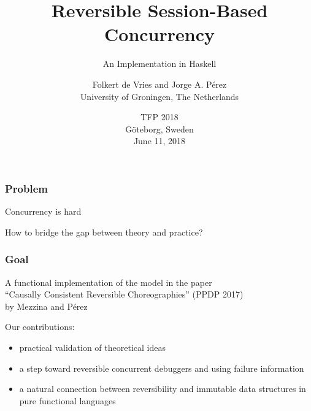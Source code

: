 \documentclass[12pt]{beamer}
\institute{}
\title[\textcolor{white}{Reversible Session-Based Concurrency}]{Reversible Session-Based Concurrency}
\subtitle{An Implementation in Haskell}
\author[de Vries \& P\'{e}rez]{{\large Folkert de Vries and  	
Jorge A. P\'{e}rez} \\ [2mm]
University of Groningen, The Netherlands
}
\date[June 11, 2018]
{
TFP 2018\\ G\"{o}teborg, Sweden
\\
June 11, 2018
}
\begin{document}
%
%
%


\begin{frame}

\begin{center}
\maketitle
\end{center}

\end{frame}


\begin{frame}
\frametitle{Problem}
\begin{center}

    \LARGE{Concurrency is hard}

    \Large{How to bridge the gap between theory and practice?}




\end{center}
\end{frame}

\begin{frame}
\frametitle{Goal}
\begin{center}

    A functional implementation of the model in the paper \\ ``Causally Consistent Reversible Choreographies'' (PPDP 2017) \\ by Mezzina and P\'{e}rez 
\end{center}
\bigskip

Our contributions:
\begin{itemize}
    \item practical validation of theoretical ideas
    \item a step toward reversible concurrent debuggers and using failure information 
    \item a natural connection between reversibility and immutable data structures in pure functional languages 
\end{itemize}


\end{frame}
\end{document}
